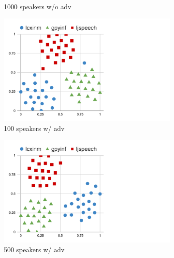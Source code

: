 \begin{figure}[!ht]
\begin{minipage}[b]{0.9\linewidth}
\begin{subfigure}[b]{0.3\linewidth}
            \caption{1000 speakers w/o adv}
        \end{subfigure}   
    \end{minipage}
    \begin{minipage}[b]{0.9\linewidth}
        \centering
        \begin{subfigure}[b]{0.3\linewidth}
            \centering
            \includegraphics[width=\linewidth,trim=0 0 200 0,clip]{figure/5_dvector21.pdf}
            \caption{100 speakers w/ adv}
        \end{subfigure}        
        \begin{subfigure}[b]{0.3\linewidth}
            \centering
            \includegraphics[width=\linewidth,trim=0 0 200 0,clip]{figure/5_dvector22.pdf}
            \caption{500 speakers w/ adv}
        \end{subfigure}   
        \begin{subfigure}[b]{0.3\linewidth}
            \centering

\end{subfigure}
\end{minipage}
\end{figure}
